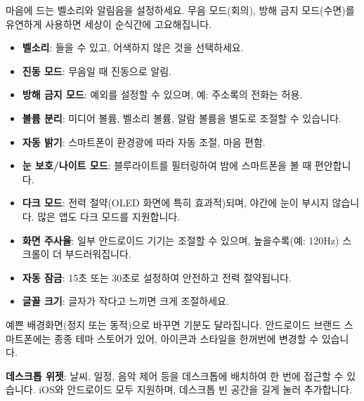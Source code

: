 


마음에 드는 벨소리와 알림음을 설정하세요. 무음 모드(회의), 방해 금지 모드(수면)를 유연하게 사용하면 세상이 순식간에 고요해집니다.

\begin{itemize}
  \item \textbf{벨소리}: 들을 수 있고, 어색하지 않은 것을 선택하세요.
  \item \textbf{진동 모드}: 무음일 때 진동으로 알림.
  \item \textbf{방해 금지 모드}: 예외를 설정할 수 있으며, 예: 주소록의 전화는 허용.
  \item \textbf{볼륨 분리}: 미디어 볼륨, 벨소리 볼륨, 알람 볼륨을 별도로 조절할 수 있습니다.
\end{itemize}


\begin{itemize}
  \item \textbf{자동 밝기}: 스마트폰이 환경광에 따라 자동 조절, 마음 편함.
  \item \textbf{눈 보호/나이트 모드}: 블루라이트를 필터링하여 밤에 스마트폰을 볼 때 편안합니다.
  \item \textbf{다크 모드}: 전력 절약(OLED 화면에 특히 효과적)되며, 야간에 눈이 부시지 않습니다. 많은 앱도 다크 모드를 지원합니다.
  \item \textbf{화면 주사율}: 일부 안드로이드 기기는 조절할 수 있으며, 높을수록(예: 120Hz) 스크롤이 더 부드러워집니다.
  \item \textbf{자동 잠금}: 15초 또는 30초로 설정하여 안전하고 전력 절약됩니다.
  \item \textbf{글꼴 크기}: 글자가 작다고 느끼면 크게 조절하세요.
\end{itemize}


예쁜 배경화면(정지 또는 동적)으로 바꾸면 기분도 달라집니다. 안드로이드 브랜드 스마트폰에는 종종 테마 스토어가 있어, 아이콘과 스타일을 한꺼번에 변경할 수 있습니다.

\textbf{데스크톱 위젯}: 날씨, 일정, 음악 제어 등을 데스크톱에 배치하여 한 번에 접근할 수 있습니다. iOS와 안드로이드 모두 지원하며, 데스크톱 빈 공간을 길게 눌러 추가합니다.

